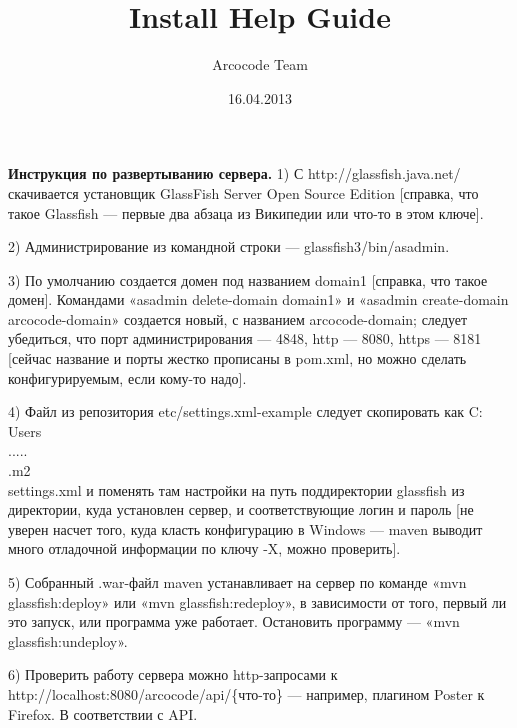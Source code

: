 \documentclass[a4paper,12pt]{article}
\title{Install Help Guide}
\date{16.04.2013}
\author{Arcocode Team}
\begin{document}
\maketitle
\newpage
\textbf{Инструкция по развертыванию сервера.}
1) С http://glassfish.java.net/ скачивается установщик GlassFish Server Open Source Edition [справка, что такое Glassfish — первые два абзаца из Википедии или что-то в этом ключе].

2) Администрирование из командной строки — glassfish3/bin/asadmin.

3) По умолчанию создается домен под названием domain1 [справка, что такое домен]. Командами «asadmin delete-domain domain1» и «asadmin create-domain arcocode-domain» создается новый, с названием arcocode-domain; следует убедиться, что порт администрирования — 4848, http — 8080, https — 8181 [сейчас название и порты жестко прописаны в pom.xml, но можно сделать конфигурируемым, если кому-то надо].

4) Файл из репозитория etc/settings.xml-example следует скопировать как C:\\Users\\.....\\.m2\\settings.xml и поменять там настройки на путь поддиректории glassfish из директории, куда установлен сервер, и соответствующие логин и пароль [не уверен насчет того, куда класть конфигурацию в Windows — maven выводит много отладочной информации по ключу -X, можно проверить].

5) Собранный .war-файл maven устанавливает на сервер по команде «mvn glassfish:deploy» или «mvn glassfish:redeploy», в зависимости от того, первый ли это запуск, или программа уже работает. Остановить программу — «mvn glassfish:undeploy».

6) Проверить работу сервера можно http-запросами к http://localhost:8080/arcocode/api/\{что-то\} — например, плагином Poster к Firefox. В соответствии с API.
\end{document}
